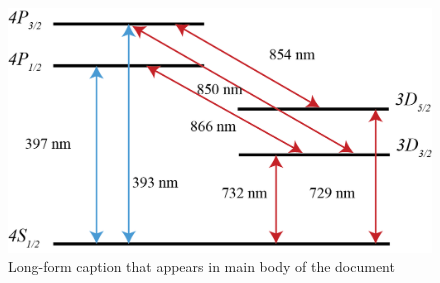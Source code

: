 \begin{figure}[h!]

\centering

\includegraphics[width=.8\textwidth]{Chapters/Figures/calcium_levels_1-1.PNG}

\caption[Short-form caption]{Long-form caption that appears in main body of the document}


\end{figure}
